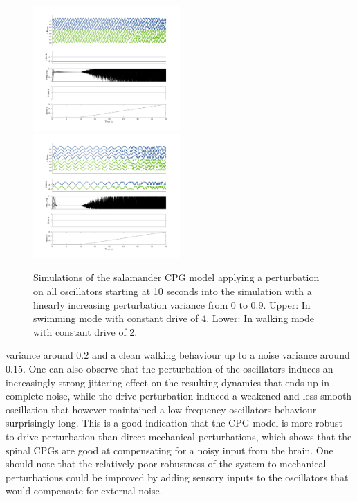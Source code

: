 \documentclass[a4paper]{scrartcl}
\begin{document}
\begin{figure}[!h]
	\includegraphics[width=0.5\textwidth]{fig/figure7b_allphase-swim.png}
	\includegraphics[width=0.5\textwidth]{fig/figure7b_allphase-walk.png}
	\caption{Simulations of the salamander CPG model applying a perturbation on all oscillators starting at 10 seconds into the simulation with a linearly increasing perturbation variance from 0 to 0.9. Upper: In swimming mode with constant drive of 4. Lower: In walking mode with constant drive of 2.}
	\label{fig:7b-allphase}
\end{figure}

{\setlength{\parindent}{0 cm}
variance around 0.2 and a clean walking behaviour up to a noise variance around 0.15. One can also observe that the perturbation of the oscillators induces an increasingly strong jittering effect on the resulting dynamics that ends up in complete noise, while the drive perturbation induced a weakened and less smooth oscillation that however maintained a low frequency oscillators behaviour surprisingly long. This is a good indication that the CPG model is more robust to drive perturbation than direct mechanical perturbations, which shows that the spinal CPGs are good at compensating for a noisy input from the brain. One should note that the relatively poor robustness of the system to mechanical perturbations could be improved by adding sensory inputs to the oscillators that would compensate for external noise.
}
\end{document}
